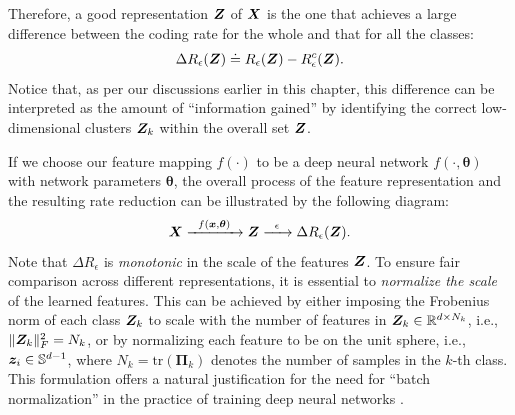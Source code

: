 \documentclass[../../book-main.tex]{subfiles}
\begin{document}

Therefore, a good representation $\bm{Z}$ of $\bm{X}$ is the one that achieves a large difference between the coding rate for the whole and that for all the classes:
\begin{equation}
	\Delta R_{\epsilon}(\bm{Z}) \doteq R_{\epsilon}(\bm{Z}) - R_{\epsilon}^c(\bm{Z}).
	\label{chap4-eqn:coding-length-reduction}
\end{equation}
Notice that, as per our discussions earlier in this chapter, this difference can be interpreted as the amount of ``information gained'' by identifying the correct low-dimensional clusters $\bm{Z}_k$ within the overall set $\bm{Z}$.

If we choose our feature mapping $f(\cdot)$ to be a deep neural network $f(\cdot,\bm \theta)$ with network parameters $\bm \theta$, the overall process of the feature representation and the resulting rate reduction  can be illustrated by the following diagram:
\begin{equation}
	\bm{X}
	\xrightarrow{\hspace{2mm} f(\bm{x}, \bm \theta)\hspace{2mm}} \bm{Z}  \xrightarrow{\hspace{2mm} \epsilon \hspace{2mm}} \Delta R_{\epsilon}(\bm{Z}).
	\label{chap4-eqn:flow}
\end{equation}
Note that $\Delta R_{\epsilon}$ is {\em monotonic} in the scale of the features $\bm{Z}$. To ensure fair comparison across different representations, it is essential to {\em normalize the scale} of the learned features. This can be achieved by either imposing the Frobenius norm of each class $\bm{Z}_k$ to scale with the number of features in $\bm{Z}_k \in \mathbb R^{d \times N_k}$, i.e., $\|\bm{Z}_k\|_F^2 = N_k$, or by normalizing each feature to be on the unit sphere, i.e., $\bm{z}_i \in \mathbb{S}^{d-1}$, where $N_k=\mathrm{tr}(\bm \Pi_k)$ denotes the number of samples in the $k$-th class. This formulation offers a natural justification for the need for ``batch normalization'' in the practice of
training deep neural networks \cite{ioffe2015batch}. %
\end{document}
